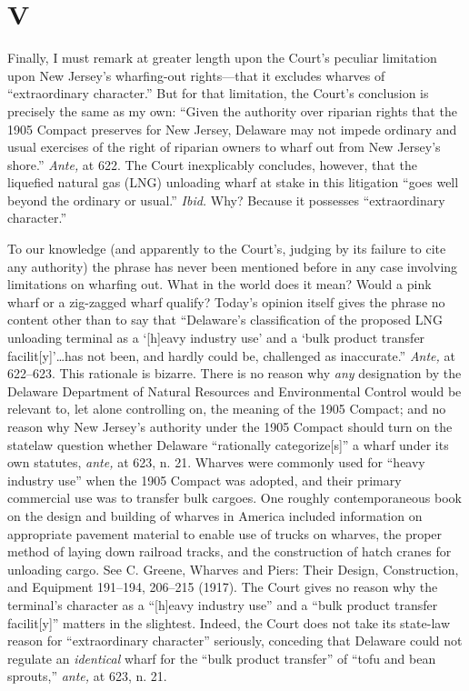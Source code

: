 {\section{V}

  Finally, I must remark at greater length upon the Court's peculiar
limitation upon New Jersey's wharfing-out rights---that it excludes
wharves of ``extraordinary character.'' But for that limitation, the
Court's conclusion is precisely the same as my own: ``Given the
authority over riparian rights that the 1905 Compact preserves for New
Jersey, Delaware may not impede ordinary and usual exercises of the
right of riparian owners to wharf out from New Jersey's shore.''
\emph{Ante,} at 622. The Court inexplicably concludes, however, that
the liquefied natural gas (LNG) unloading wharf at stake in this
litigation ``goes well beyond the ordinary or usual.'' \emph{Ibid.}
Why? Because it possesses ``extraordinary character.''

  To our knowledge (and apparently to the Court's, judging by its
failure to cite any authority) the phrase has never been mentioned
before in any case involving limitations on wharfing out. What in the
world does it mean? Would a pink wharf or a zig-zagged wharf qualify?
Today's opinion itself gives the phrase no content other than to
say that ``Delaware's classification of the proposed LNG unloading
terminal as a ‘[h]eavy industry use' and a ‘bulk product transfer
facilit[y]'\dots has not been, and hardly could be, challenged as
inaccurate.'' \emph{Ante,} at 622--623. This rationale is bizarre.
There is no reason why \emph{any} designation by the Delaware Department of
Natural Resources and Environmental Control would be relevant to, let
alone controlling on, the meaning of the 1905 Compact; and no reason
why New Jersey's authority under the 1905 Compact should turn on
the statelaw question whether Delaware ``rationally categorize[s]''
a \newpage  wharf under its own statutes, \emph{ante,} at 623, n. 21.
Wharves were commonly used for ``heavy industry use'' when the 1905
Compact was adopted, and their primary commercial use was to transfer
bulk cargoes. One roughly contemporaneous book on the design and
building of wharves in America included information on appropriate
pavement material to enable use of trucks on wharves, the proper method
of laying down railroad tracks, and the construction of hatch cranes
for unloading cargo. See C. Greene, Wharves and Piers: Their Design,
Construction, and Equipment 191--194, 206--215 (1917). The Court
gives no reason why the terminal's character as a ``[h]eavy industry
use'' and a ``bulk product transfer facilit[y]'' matters in the
slightest. Indeed, the Court does not take its state-law reason for
``extraordinary character'' seriously, conceding that Delaware could
not regulate an \emph{identical} wharf for the ``bulk product transfer''
of ``tofu and bean sprouts,'' \emph{ante,} at 623, n. 21.

}
